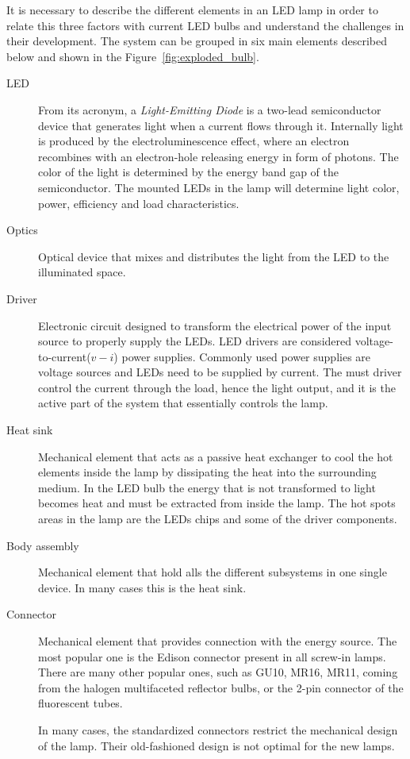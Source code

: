 It is necessary to describe the different elements in an LED lamp in order to relate this three factors with current LED bulbs and understand the challenges in their development. The system can be grouped in six main elements described below and shown in  the Figure~\ref{fig:exploded_bulb}.

\begin{description}
  \item[LED] From its acronym, a \emph{Light-Emitting Diode}  is a two-lead semiconductor device that generates light when a current flows through it. Internally light is produced by the electroluminescence effect, where an electron recombines with an electron-hole releasing energy in form of photons. The color of the light is determined by the energy band gap of the semiconductor. The mounted LEDs in the lamp will determine light color, power, efficiency and load characteristics.

  \item[Optics] Optical device that mixes and distributes the light from the LED to the illuminated space.

  \item[Driver] Electronic circuit designed to transform the electrical power of the input source to properly supply the LEDs. LED drivers are considered voltage-to-current($v-i$) power supplies. Commonly used power supplies are voltage sources and LEDs need to be supplied by current. The must driver control the current through the load, hence the light output, and it is the active part of the system that essentially controls the lamp.

  \item[Heat sink] Mechanical element that acts as a passive heat exchanger to cool the hot elements inside the lamp by dissipating the heat into the surrounding medium. In the LED bulb the energy that is not transformed to light becomes heat and must be extracted from inside the lamp. The hot spots areas in the lamp are the LEDs chips and some of the driver components.

  \item[Body assembly] Mechanical element that hold alls the different subsystems in one single device. In many cases this is the heat sink.

  \item[Connector] Mechanical element that provides connection with the energy source. The most popular one is the Edison connector present in all screw-in lamps. There are many other popular ones, such as GU10, MR16, MR11, coming from the halogen multifaceted reflector bulbs, or the 2-pin connector of the fluorescent tubes.

      In many cases, the standardized connectors restrict the mechanical design of the lamp. Their old-fashioned design is not optimal for the new lamps.
\end{description}

